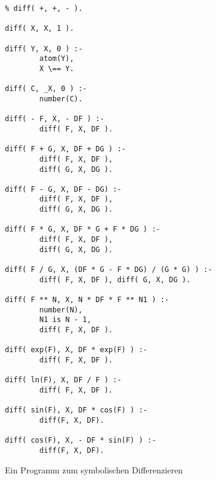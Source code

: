 \begin{figure}[!h]
  \centering
\begin{verbatim}
% diff( +, +, - ).

diff( X, X, 1 ).

diff( Y, X, 0 ) :- 
        atom(Y),
        X \== Y.

diff( C, _X, 0 ) :-
        number(C).

diff( - F, X, - DF ) :-
        diff( F, X, DF ).

diff( F + G, X, DF + DG ) :- 
        diff( F, X, DF ), 
        diff( G, X, DG ).

diff( F - G, X, DF - DG) :- 
        diff( F, X, DF ), 
        diff( G, X, DG ).

diff( F * G, X, DF * G + F * DG ) :- 
        diff( F, X, DF ), 
        diff( G, X, DG ).

diff( F / G, X, (DF * G - F * DG) / (G * G) ) :- 
        diff( F, X, DF ), diff( G, X, DG ).

diff( F ** N, X, N * DF * F ** N1 ) :-
        number(N),
        N1 is N - 1,
        diff( F, X, DF ).

diff( exp(F), X, DF * exp(F) ) :- 
        diff( F, X, DF ).

diff( ln(F), X, DF / F ) :- 
        diff( F, X, DF ).

diff( sin(F), X, DF * cos(F) ) :-
        diff(F, X, DF).

diff( cos(F), X, - DF * sin(F) ) :-
        diff(F, X, DF).
\end{verbatim}
  \caption{Ein Programm zum symbolischen Differenzieren}
  \label{fig:symbolisch-diff}
\end{figure}

